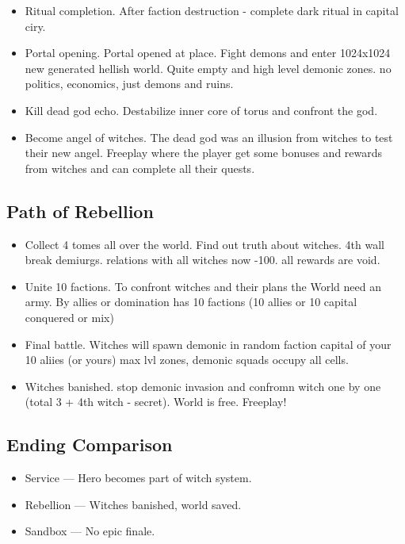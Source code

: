\documentclass[a4paper,12pt]{article}
\begin{document}
\begin{itemize}
\item Ritual completion. After faction destruction - complete dark ritual in capital ciry. 
\item Portal opening. Portal opened at place. Fight demons and enter 1024x1024 new generated hellish world. Quite empty and high level demonic zones. no politics, economics, just demons and ruins.
\item Kill dead god echo. Destabilize inner core of torus and confront the god. 
\item Become angel of witches. The dead god was an illusion from witches to test their new angel. Freeplay where the player get some bonuses and rewards from witches and can complete all their quests.
\end{itemize}



\subsection{Path of Rebellion}

\begin{itemize}
\item Collect 4 tomes all over the world. Find out truth about witches. 4th wall break demiurgs. relations with all witches now -100. all rewards are void.
\item Unite 10 factions. To confront witches and their plans the World need an army. By allies or domination has 10 factions (10 allies or 10 capital conquered or mix)
\item Final battle. Witches will spawn demonic in random faction capital of your 10 aliies (or yours) max lvl zones, demonic squads occupy all cells.
\item Witches banished. stop demonic invasion and confromn witch one by one (total 3 + 4th witch - secret). World is free. Freeplay!
\end{itemize}



\subsection{Ending Comparison}

\begin{itemize}
\item Service — Hero becomes part of witch system.
\item Rebellion — Witches banished, world saved.
\item Sandbox — No epic finale.
\end{itemize}
\end{document}
